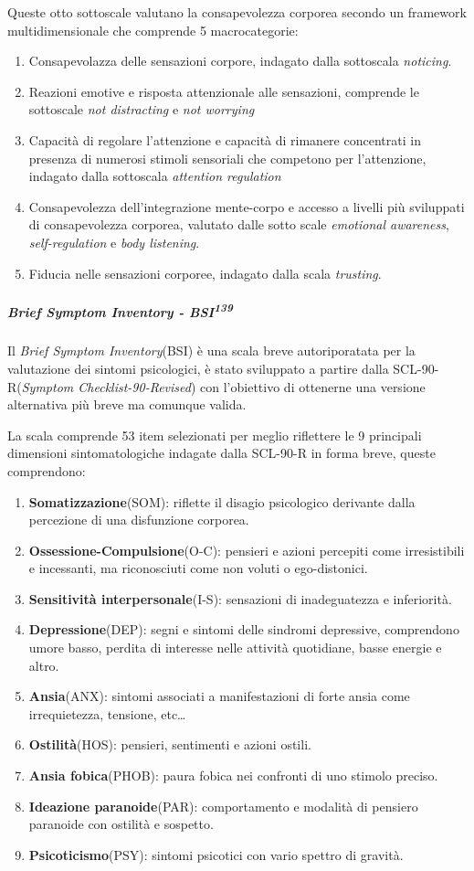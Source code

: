 \documentclass[12pt]{article}
\makeatletter
\newcommand{\cslcitation}[2]
 {\protect\hyper@linkstart{cite}{citeproc_bib_item_#1}#2\hyper@linkend}
\makeatother
\begin{document}
Queste otto sottoscale valutano la consapevolezza corporea secondo un framework multidimensionale che comprende 5 macrocategorie:
\begin{enumerate}
\item Consapevolazza delle sensazioni corpore, indagato dalla sottoscala \emph{noticing}.
\item Reazioni emotive e risposta attenzionale alle sensazioni, comprende le sottoscale \emph{not distracting} e \emph{not worrying}
\item Capacità di regolare l'attenzione e capacità di rimanere concentrati in presenza di numerosi stimoli sensoriali che competono per l'attenzione, indagato dalla sottoscala \emph{attention regulation}
\item Consapevolezza dell'integrazione mente-corpo e accesso a livelli più sviluppati di consapevolezza corporea, valutato dalle sotto scale \emph{emotional awareness}, \emph{self-regulation} e \emph{body listening}.
\item Fiducia nelle sensazioni corporee, indagato dalla scala \emph{trusting}.
\end{enumerate}
\subparagraph{Brief Symptom Inventory - BSI\textsuperscript{\cslcitation{139}{139}}}
\label{sec:org9332eba}
Il \textit{Brief Symptom Inventory}(BSI) è una scala breve autoriporatata per la valutazione dei sintomi psicologici, è stato sviluppato a partire dalla SCL-90-R(\textit{Symptom Checklist-90-Revised}) con l'obiettivo di ottenerne una versione alternativa più breve ma comunque valida.

La scala comprende 53 item selezionati per meglio riflettere le 9 principali dimensioni sintomatologiche indagate dalla SCL-90-R in forma breve, queste comprendono:
\begin{enumerate}
\item \textbf{Somatizzazione}(SOM): riflette il disagio psicologico derivante dalla percezione di una disfunzione corporea.
\item \textbf{Ossessione-Compulsione}(O-C): pensieri e azioni percepiti come irresistibili e incessanti, ma riconosciuti come non voluti o ego-distonici.
\item \textbf{Sensitività interpersonale}(I-S): sensazioni di inadeguatezza e inferiorità.
\item \textbf{Depressione}(DEP): segni e sintomi delle sindromi depressive, comprendono umore basso, perdita di interesse nelle attività quotidiane, basse energie e altro.
\item \textbf{Ansia}(ANX): sintomi associati a manifestazioni di forte ansia come irrequietezza, tensione, etc\ldots{}
\item \textbf{Ostilità}(HOS): pensieri, sentimenti e azioni ostili.
\item \textbf{Ansia fobica}(PHOB): paura fobica nei confronti di uno stimolo preciso.
\item \textbf{Ideazione paranoide}(PAR): comportamento e modalità di pensiero paranoide con ostilità e sospetto.
\item \textbf{Psicoticismo}(PSY): sintomi psicotici con vario spettro di gravità.
\end{enumerate}
\end{document}
